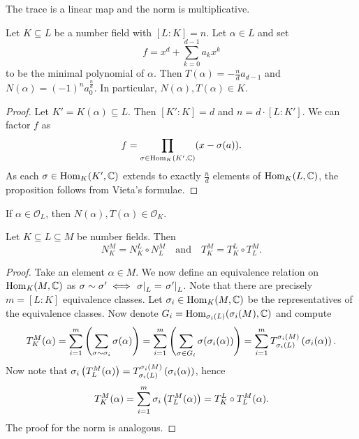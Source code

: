\begin{trditev}
The trace is a linear map and the norm is multiplicative.
\end{trditev}

\obvs


\begin{trditev}
Let $K \subseteq L$ be a number field with $[L : K] = n$. Let
$\alpha \in L$ and set
\[
f = x^d + \sum_{k=0}^{d-1} a_k x^k
\]
to be the minimal polynomial of $\alpha$. Then
$T(\alpha) = -\frac{n}{d} a_{d-1}$ and
$N(\alpha) = (-1)^n a_0^{\frac{n}{d}}$. In particular,
$N(\alpha), T(\alpha) \in K$.
\end{trditev}

\begin{proof}
Let $K' = K(\alpha) \subseteq L$. Then $[K' : K] = d$ and
$n = d \cdot [L : K']$.  We can factor $f$ as
\[
f = \prod_{\sigma \in \operatorname{Hom}_K(K', \mathbb{C})} (x - \sigma(a)).
\]
As each $\sigma \in \operatorname{Hom}_K(K', \mathbb{C})$ extends to exactly
$\frac{n}{d}$ elements of $\operatorname{Hom}_K(L, \mathbb{C})$, the proposition follows
from Vieta's formulae.
\end{proof}

\begin{opomba}
If $\alpha \in \mathcal{O}_L$, then
$N(\alpha), T(\alpha) \in \mathcal{O}_K$.
\end{opomba}

\begin{lema}
Let $K \subseteq L \subseteq M$ be number fields. Then
\[
N_K^M = N_K^L \circ N_L^M
\quad \text{and} \quad
T_K^M = T_K^L \circ T_L^M.
\]
\end{lema}

\begin{proof}
Take an element $\alpha \in M$. We now define an equivalence
relation on $\operatorname{Hom}_K(M, \mathbb{C})$ as
$\sigma \sim \sigma' \iff
\left. \sigma\right|_{L}^{} = \left. \sigma'\right|_{L}^{}$. Note that there are
precisely $m = [L : K]$ equivalence classes. Let
$\sigma_i \in \operatorname{Hom}_K(M, \mathbb{C})$ be the representatives of the
equivalence classes. Now denote
$G_i = \operatorname{Hom}_{\sigma_i(L)}(\sigma_i(M), \mathbb{C})$ and compute
\[
T_K^M(\alpha) =
\sum_{i=1}^m \left(\sum_{\sigma \sim \sigma_i} \sigma(\alpha)\right) =
\sum_{i=1}^m \left(\sum_{\sigma \in G_i} \sigma(\sigma_i(\alpha))\right) =
\sum_{i=1}^m T_{\sigma_i(L)}^{\sigma_i(M)} \left(\sigma_i(\alpha)\right).
\]
Now note that
$\sigma_i \left(T_L^M(\alpha)\right) =
T_{\sigma_i(L)}^{\sigma_i(M)} \left(\sigma_i(\alpha)\right)$, hence
\[
T_K^M(\alpha) =
\sum_{i=1}^m \sigma_i \left(T_L^M(\alpha)\right) =
T_K^L \circ T_L^M(\alpha).
\]
The proof for the norm is analogous.
\end{proof}

